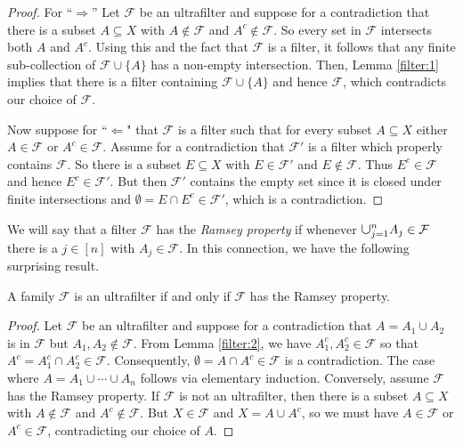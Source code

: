 \begin{proof}
For ``$\Rightarrow$'' Let \( \mathcal{F}  \) be an ultrafilter and suppose for a contradiction that there is a subset \( A \subseteq X \) with \( A \notin \mathcal{F}  \) and \( A^{c} \notin \mathcal{F}  \). So every set in \( \mathcal{F}  \) intersects both \( A \) and \( A^{c}  \). Using this and the fact that \( \mathcal{F}  \) is a filter, it follows that any finite sub-collection of \( \mathcal{F} \cup \{ A \}  \) has a non-empty intersection. Then, Lemma \ref{filter:1} implies that there is a filter containing \( \mathcal{F} \cup \{ A \}  \) and hence \( \mathcal{F}  \), which contradicts our choice of \( \mathcal{F}  \).

Now suppose for ``$\Leftarrow$" that \( \mathcal{F}  \) is a filter such that for every subset \( A \subseteq X \) either \( A \in \mathcal{F}  \) or \( A^{c} \in \mathcal{F}  \). Assume for a contradiction that \( \mathcal{F}' \) is a filter which properly contains \( \mathcal{F}  \). So there is a subset \( E \subseteq X \) with \( E \in \mathcal{F} ' \) and \( E \notin \mathcal{F}  \). Thus \( E^{c} \in \mathcal{F}  \) and hence \( E^{c} \in \mathcal{F} ' \). But then \( \mathcal{F} ' \) contains the empty set since it is closed under finite intersections and \( \emptyset = E \cap E^{c} \in \mathcal{F} ' \), which is a contradiction.
\end{proof}
We will say that a filter \( \mathcal{F}  \) has the \emph{Ramsey property} if whenever \( \medcup_{j=1}^{n} A_{j}  \in \mathcal{F}  \) there is a \( j \in [n] \) with \( A_{j} \in \mathcal{F}  \). In this connection, we have the following surprising result.
\begin{lemma}
\label{filter:3}
A family \( \mathcal{F}  \) is an ultrafilter if and only if \( \mathcal{F}  \) has the Ramsey property.
\end{lemma}
\begin{proof}
	Let \( \mathcal{F}  \) be an ultrafilter and suppose for a contradiction that \( A = A_1 \cup A_2 \) is in \( \mathcal{F}\) but \( A_1, A_2 \notin \mathcal{F}  \). From Lemma \ref{filter:2}, we have \( A_1^{c} , A_2^{c} \in \mathcal{F}  \) so that \( A^{c} = A_1^{c} \cap A_2^{c} \in \mathcal{F}  \). Consequently, \( \emptyset = A \cap A^{c} \in \mathcal{F}  \) is a contradiction. The case where \( A = A_1 \cup \cdots \cup A_{n}  \) follows via elementary induction. Conversely, assume \( \mathcal{F}  \) has the Ramsey property. If \( \mathcal{F}  \) is not an ultrafilter, then there is a subset \( A \subseteq X \) with \( A \notin \mathcal{F}  \) and \( A^{c} \notin \mathcal{F}  \). But \(X \in \mathcal{F}  \) and \( X = A \cup A^{c}  \), so we must have \( A \in \mathcal{F}  \) or \( A^{c} \in \mathcal{F}  \), contradicting our choice of \( A \).
\end{proof}

